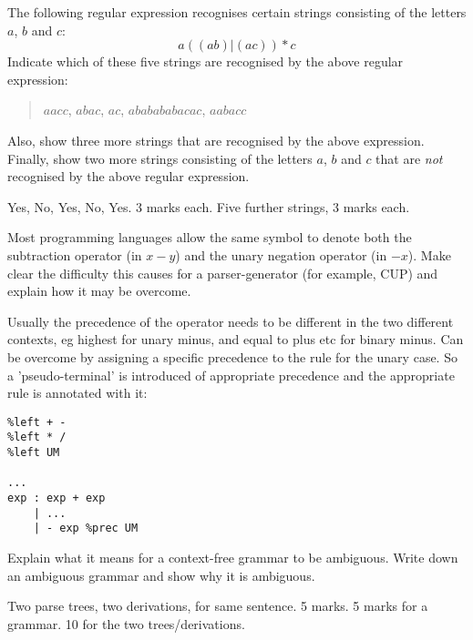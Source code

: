\documentclass[11pt]{cityexam}
\begin{document}
\begin{questions}


\question

\begin{subquestions}


\subquestion
The following regular expression recognises certain strings consisting of the
letters $a$, $b$ and $c$:
\[
a((ab)|(ac))*c
\]
Indicate which of these five strings are recognised by the above regular expression:
\begin{quote}
$aacc$, $abac$, $ac$, $ababababacac$, $aabacc$
\end{quote}
Also, show three more strings that are recognised by the above expression.
Finally, show two more strings consisting of 
the letters $a$, $b$ and $c$ that are \emph{not} 
recognised by the above regular expression.

\begin{modelanswer}
Yes, No, Yes, No, Yes. 3 marks each. 
Five further strings, 3 marks each.
\end{modelanswer}


\subquestion
Most programming languages allow the same symbol to denote both the 
subtraction operator (in $x-y$) and the unary negation operator (in $-x$).
Make clear the difficulty this causes for a parser-generator (for example, CUP)
and explain how it may be overcome.

\begin{modelanswer}
Usually the precedence of the operator needs to be different in the two different
contexts, eg highest for unary minus, and equal to plus etc for binary minus.
Can be overcome by assigning a specific precedence to the rule for the unary case.
So a 'pseudo-terminal' is introduced of appropriate precedence and the
appropriate rule is annotated with it: 
\begin{verbatim}
%left + - 
%left * /
%left UM

...
exp : exp + exp
    | ...
    | - exp %prec UM
\end{verbatim}
\end{modelanswer}

\subquestion
Explain what it means for a context-free grammar to be ambiguous. 
Write down an ambiguous grammar and show why it is ambiguous.

\begin{modelanswer}
Two parse trees, two derivations, for same sentence. 5 marks.
5 marks for a grammar. 10 for the two trees/derivations.
\end{modelanswer}


\end{subquestions}
\end{questions}
\end{document}
